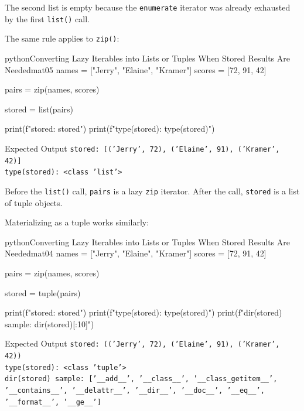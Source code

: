 The second list is empty because the \texttt{enumerate} iterator was already exhausted by the first \texttt{list()} call.

The same rule applies to \texttt{zip()}:

\begin{codebox}[]{python}{Converting Lazy Iterables into Lists or Tuples When Stored Results Are Needed}{mat05}
names = ["Jerry", "Elaine", "Kramer"]
scores = [72, 91, 42]

pairs = zip(names, scores)

stored = list(pairs)

print(f"stored: {stored}")
print(f"type(stored): {type(stored)}")
\end{codebox}


\begin{iobox}{Expected Output}
\texttt{stored: [('Jerry', 72), ('Elaine', 91), ('Kramer', 42)]} \\
\texttt{type(stored): <class 'list'>} \\
\end{iobox}


Before the \texttt{list()} call, \texttt{pairs} is a lazy \texttt{zip} iterator. After the call, \texttt{stored} is a list of tuple objects.

Materializing as a tuple works similarly:

\begin{codebox}[]{python}{Converting Lazy Iterables into Lists or Tuples When Stored Results Are Needed}{mat04}
names = ["Jerry", "Elaine", "Kramer"]
scores = [72, 91, 42]

pairs = zip(names, scores)

stored = tuple(pairs)

print(f"stored: {stored}")
print(f"type(stored): {type(stored)}")
print(f"dir(stored) sample: {dir(stored)[:10]}")
\end{codebox}


\begin{iobox}{Expected Output}
\texttt{stored: (('Jerry', 72), ('Elaine', 91), ('Kramer', 42))} \\
\texttt{type(stored): <class 'tuple'>} \\
\texttt{dir(stored) sample: ['\_\_add\_\_', '\_\_class\_\_', '\_\_class\_getitem\_\_',} \\
\texttt{'\_\_contains\_\_', '\_\_delattr\_\_', '\_\_dir\_\_', '\_\_doc\_\_', '\_\_eq\_\_',} \\
\texttt{'\_\_format\_\_', '\_\_ge\_\_']} \\
\end{iobox}


